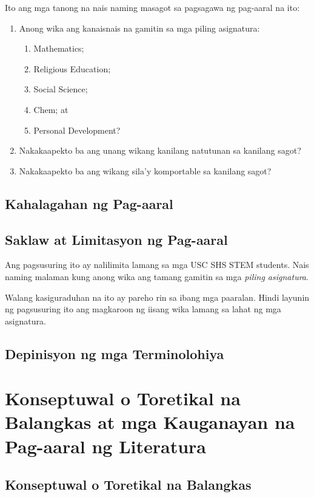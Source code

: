 \documentclass [11pt] {report}
\begin{document}
Ito ang mga tanong na nais naming masagot sa pagsagawa ng pag-aaral na ito:

\begin{enumerate}[parsep=\baselineskip,itemsep=-0.5\baselineskip]
\item Anong wika ang kanaisnais na gamitin sa mga piling asignatura:
  \begin{enumerate}[nosep]
  \item Mathematics;
  \item Religious Education;
  \item Social Science;
  \item Chem; at
  \item Personal Development?
  \end{enumerate}
\item Nakakaapekto ba ang unang wikang kanilang natutunan sa kanilang sagot?
\item Nakakaapekto ba ang wikang sila'y komportable sa kanilang sagot?
\end{enumerate}

\section{Kahalagahan ng Pag-aaral}

\pagebreak
\section {Saklaw at Limitasyon ng Pag-aaral}
Ang pagsusuring ito ay nalilimita lamang sa mga USC SHS STEM students. Nais
naming malaman kung anong wika ang tamang gamitin sa mga \emph{piling
  asignatura}.

Walang kasiguraduhan na ito ay pareho rin sa ibang mga paaralan. Hindi layunin
ng pagsusuring ito ang magkaroon ng iisang wika lamang sa lahat ng mga
asignatura.

\section{Depinisyon ng mga Terminolohiya}

\chapter{Konseptuwal o Toretikal na Balangkas at mga Kauganayan na Pag-aaral ng Literatura}
\section {Konseptuwal o Toretikal na Balangkas}
\pagebreak
\end{document}
